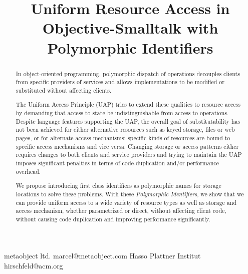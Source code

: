 \documentclass[preprint]{sigplanconf}
\begin{document}


\copyrightdata{[to be supplied]} 



\title{Uniform Resource Access in Objective-Smalltalk with Polymorphic Identifiers}



           {metaobject ltd.}
           {marcel@metaobject.com}
           {Hasso Plattner Institut}
           {hirschfeld@acm.org}


\maketitle

\begin{abstract}

In object-oriented programming, polymorphic dispatch of operations
decouples clients from specific providers of services and allows 
implementations to be modified or substituted without affecting clients. 

The Uniform Access Principle (UAP) tries to extend these qualities to 
resource access by demanding that access to state be indistinguishable
from access to operations.  Despite language features supporting the
UAP, the overall goal of substitutability has not been achieved for
either alternative resources such as keyed storage, files or web pages, or for alternate 
access mechanisms:    
specific kinds of resources are bound to specific access mechanisms and vice versa.
Changing storage or access patterns either requires changes to both clients and
service providers and trying to maintain the UAP imposes significant penalties in terms of
code-duplication and/or performance overhead.

We propose introducing first class identifiers as polymorphic names for storage locations
to solve these problems.  With these \emph{Polymorphic Identifiers}, we show that
we can provide uniform access to a wide variety of resource types as well as 
storage and access mechanism, whether parametrized or direct, without affecting
client code, without causing code duplication and improving performance significantly.

\end{abstract}
\end{document}
